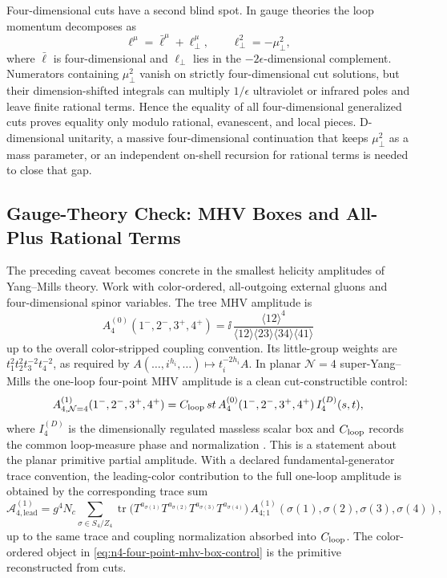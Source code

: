 Four-dimensional cuts have a second blind spot.  In gauge theories the loop
momentum decomposes as
\[
  \ell^\mu=\bar\ell^\mu+\ell_\perp^\mu,\qquad
  \ell_\perp^2=-\mu_\perp^2 ,
\]
where \(\bar\ell\) is four-dimensional and \(\ell_\perp\) lies in the
\(-2\epsilon\)-dimensional complement.  Numerators containing
\(\mu_\perp^2\) vanish on strictly four-dimensional cut solutions, but their
dimension-shifted integrals can multiply \(1/\epsilon\) ultraviolet or
infrared poles and leave finite rational terms.  Hence the equality of all
four-dimensional generalized cuts proves equality only modulo rational,
evanescent, and local pieces.  D-dimensional unitarity, a massive
four-dimensional continuation that keeps \(\mu_\perp^2\) as a mass parameter,
or an independent on-shell recursion for rational terms is needed to close
that gap.

\subsection{Gauge-Theory Check: MHV Boxes and All-Plus Rational Terms}
\label{subsec:gauge-theory-mhv-all-plus-unitarity-check}

The preceding caveat becomes concrete in the smallest helicity amplitudes of
Yang--Mills theory.  Work with color-ordered, all-outgoing external gluons and
four-dimensional spinor variables.  The tree MHV amplitude is
\[
  A_4^{(0)}(1^-,2^-,3^+,4^+)
  =
  \ii\,
  \frac{\langle12\rangle^4}
       {\langle12\rangle\langle23\rangle\langle34\rangle\langle41\rangle}
\]
up to the overall color-stripped coupling convention.  Its little-group
weights are \(t_1^2t_2^2t_3^{-2}t_4^{-2}\), as required by
\(A(\ldots,i^{h_i},\ldots)\mapsto t_i^{-2h_i}A\).  In planar
\(\mathcal N=4\) super-Yang--Mills the one-loop four-point MHV amplitude is a
clean cut-constructible control:
\begin{equation}
  A_{4,\mathcal N=4}^{(1)}(1^-,2^-,3^+,4^+)
  =
  C_{\rm loop}\,s t\,
  A_4^{(0)}(1^-,2^-,3^+,4^+)\,
  I_4^{(D)}(s,t) ,
  \label{eq:n4-four-point-mhv-box-control}
\end{equation}
where \(I_4^{(D)}\) is the dimensionally regulated massless scalar box and
\(C_{\rm loop}\) records the common loop-measure phase and normalization
\cite{BDDK1994Unitarity,BrittoCachazoFeng2005GeneralizedUnitarity}.  This is
a statement about the planar primitive partial amplitude.  With a declared
fundamental-generator trace convention, the leading-color contribution to the
full one-loop amplitude is obtained by the corresponding trace sum
\begin{equation}
  \mathcal A_{4,\mathrm{lead}}^{(1)}
  =
  g^4N_c
  \sum_{\sigma\in S_4/Z_4}
  \operatorname{tr}\!\bigl(
    T^{a_{\sigma(1)}}T^{a_{\sigma(2)}}
    T^{a_{\sigma(3)}}T^{a_{\sigma(4)}}
  \bigr)\,
  A_{4;1}^{(1)}(\sigma(1),\sigma(2),\sigma(3),\sigma(4)),
  \label{eq:n4-leading-color-trace-partial}
\end{equation}
up to the same trace and coupling normalization absorbed into
\(C_{\rm loop}\).  The color-ordered object in
\eqref{eq:n4-four-point-mhv-box-control} is the primitive reconstructed from
cuts.

